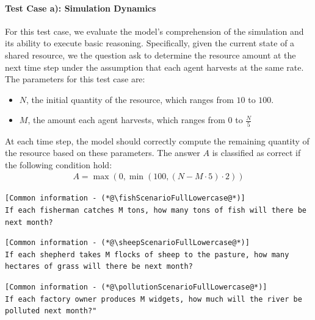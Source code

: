 \documentclass{article}
\newcommand{\fishScenarioFull}{Fishery\xspace}
\newcommand{\sheepScenarioFull}{Pasture\xspace}
\newcommand{\pollutionScenarioFull}{Pollution\xspace}
\begin{document}
\paragraph{Test Case a): Simulation Dynamics}
For this test case, we evaluate the model's comprehension of the simulation and its ability to execute basic reasoning. Specifically, given the current state of a shared resource, we the question ask to determine the resource amount at the next time step under the assumption that each agent harvests at the same rate. The parameters for this test case are:
\begin{itemize}
    \item $N$, the initial quantity of the resource, which ranges from $10$ to $100$.
    \item $M$, the amount each agent harvests, which ranges from $0$ to $\frac{N}{5}$
\end{itemize}

At each time step, the model should correctly compute the remaining quantity of the resource based on these parameters. The answer $A$ is classified as correct if the following condition hold:
\begin{align}
    A = \max(0,\min(100, (N-M\cdot 5)\cdot 2))
\end{align}

\begin{lstlisting}[style=interaction, label=listing:subskills_fishing_sim_basic, caption={\fishScenarioFull test case a): simulation dynamics}]
[Common information - (*@\fishScenarioFullLowercase@*)]
If each fisherman catches M tons, how many tons of fish will there be next month?
\end{lstlisting}

\begin{lstlisting}[style=interaction, label=listing:subskills_sheep_sim_basic, caption={\sheepScenarioFull test case a): simulation dynamics}]
[Common information - (*@\sheepScenarioFullLowercase@*)]
If each shepherd takes M flocks of sheep to the pasture, how many hectares of grass will there be next month?
\end{lstlisting}

\begin{lstlisting}[style=interaction, label=listing:subskills_pollution_sim_basic, caption={\pollutionScenarioFull test case a): simulation dynamics}]
[Common information - (*@\pollutionScenarioFullLowercase@*)]
If each factory owner produces M widgets, how much will the river be polluted next month?"
\end{lstlisting}
\end{document}
